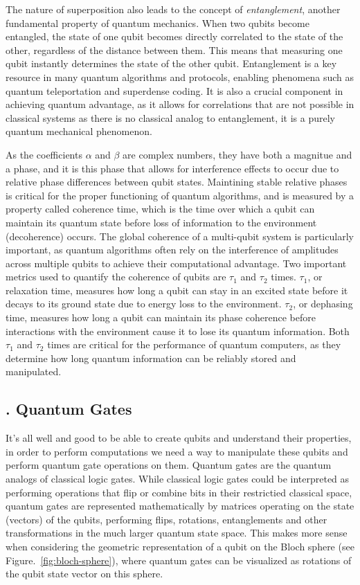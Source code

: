 \documentclass{elbioimp2}
\begin{document}
The nature of superposition also leads to the concept of \textit{entanglement}, another fundamental property of quantum mechanics. When two qubits become entangled, the state of one qubit becomes directly correlated to the state of the other, regardless of the distance between them. This means that measuring one qubit instantly determines the state of the other qubit. Entanglement is a key resource in many quantum algorithms and protocols, enabling phenomena such as quantum teleportation and superdense coding. It is also a crucial component in achieving quantum advantage, as it allows for correlations that are not possible in classical systems as there is no classical analog to entanglement, it is a purely quantum mechanical phenomenon.

As the coefficients $\alpha$ and $\beta$ are complex numbers, they have both a magnitue and a phase, and it is this phase that allows for interference effects to occur due to relative phase differences between qubit states. Maintining stable relative phases is critical for the proper functioning of quantum algorithms, and is measured by a property called coherence time, which is the time over which a qubit can maintain its quantum state before loss of information to the environment (decoherence) occurs. The global coherence of a multi-qubit system is particularly important, as quantum algorithms often rely on the interference of amplitudes across multiple qubits to achieve their computational advantage. Two important metrics used to quantify the coherence of qubits are $\tau_1$ and $\tau_2$ times. $\tau_1$, or relaxation time, measures how long a qubit can stay in an excited state before it decays to its ground state due to energy loss to the environment. $\tau_2$, or dephasing time, measures how long a qubit can maintain its phase coherence before interactions with the environment cause it to lose its quantum information. Both $\tau_1$ and $\tau_2$ times are critical for the performance of quantum computers, as they determine how long quantum information can be reliably stored and manipulated.

\subsection{. Quantum Gates}

It's all well and good to be able to create qubits and understand their properties, in order to perform computations we need a way to manipulate these qubits and perform quantum gate operations on them. Quantum gates are the quantum analogs of classical logic gates. While classical logic gates could be interpreted as performing operations that flip or combine bits in their restrictied classical space, quantum gates are represented mathematically by matrices operating on the state (vectors) of the qubits, performing flips, rotations, entanglements and other transformations in the much larger quantum state space. This makes more sense when considering the geometric representation of a qubit on the Bloch sphere (see Figure.~\ref{fig:bloch-sphere}), where quantum gates can be visualized as rotations of the qubit state vector on this sphere.
\end{document}
